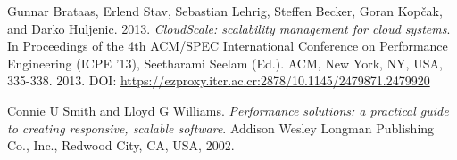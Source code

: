\documentclass[11pt, twoside]{report}
\begin{document}
\begin{thebibliography}{9}
 Gunnar Brataas, Erlend Stav, Sebastian Lehrig, Steffen Becker, Goran Kopčak, and Darko Huljenic. 2013. \emph{CloudScale: scalability management for cloud systems}. In Proceedings of the 4th ACM/SPEC International Conference on Performance Engineering (ICPE '13), Seetharami Seelam (Ed.). ACM, New York, NY, USA, 335-338. 2013. DOI: \url{https://ezproxy.itcr.ac.cr:2878/10.1145/2479871.2479920}

 Connie U Smith and Lloyd G Williams. \emph{Performance solutions: a practical guide to creating responsive, scalable software}. Addison Wesley Longman Publishing Co., Inc., Redwood City, CA, USA, 2002.

\end{thebibliography}
\end{document}
